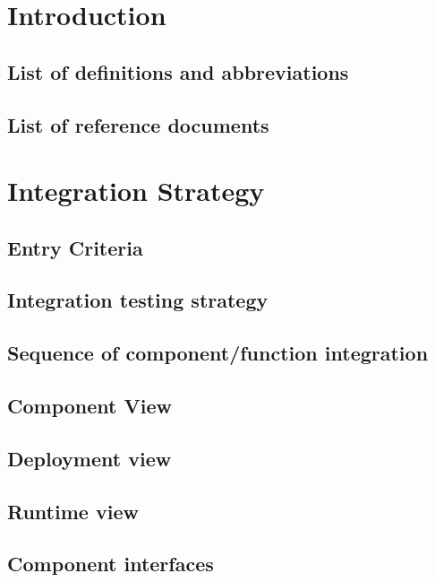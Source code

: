 \documentclass{../Common/Structure/doc_pdf}
\begin{document}
\titleToc

\chapter{Introduction}

\section{List of definitions and abbreviations}

\section{List of reference documents}

\newpage

\chapter{Integration Strategy}
\section{Entry Criteria}

\section{Integration testing strategy}

\section{Sequence of component/function integration}



\section{Component View}
\section{Deployment view}
\section{Runtime view}

\section{Component interfaces}

\end{document}
